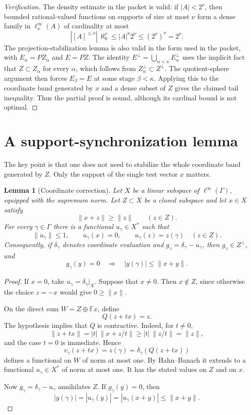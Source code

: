\documentclass[11pt]{article}
\newtheorem{lemma}[theorem]{Lemma}
\theoremstyle{remark}
\newcommand{\F}{\mathbb F}
\begin{document}
\begin{proof}[Verification]
The density estimate in the packet is valid: if \(|A|<2^\nu\), then
bounded rational-valued functions on supports of size at most \(\nu\)
form a dense family in \(\ell_\nu^\infty(A)\) of cardinality at most
\[
 |[A]^{\leq\nu}|\,\aleph_0^\nu
 \leq |A|^\nu 2^\nu
 \leq (2^\nu)^\nu=2^\nu.
\]
The projection-stabilization lemma is also valid in the form used in the
packet, with
\(E_\alpha=\overline{PZ_\alpha}\) and
\(E=\overline{PZ}\).  The identity
\(E^\perp=\bigcup_{\alpha<\kappa}E_\alpha^\perp\) uses the implicit fact
that \(Z\subset Z_\alpha\) for every \(\alpha\), which follows from
\(Z_\alpha^\perp\subset Z^\perp\).  The quotient-sphere argument then
forces \(E_\beta=E\) at some stage \(\beta<\kappa\).  Applying this to the
coordinate band generated by \(x\) and a dense subset of \(Z\) gives the
claimed tail inequality.  Thus the partial proof is sound, although its
cardinal bound is not optimal.
\end{proof}

\section{A support-synchronization lemma}

The key point is that one does not need to stabilize the whole coordinate
band generated by \(Z\).  Only the support of the single test vector
\(x\) matters.

\begin{lemma}[Coordinate correction]
\label{lem:correction}
Let \(X\) be a linear subspace of \(\ell^\infty(\Gamma)\), equipped with
the supremum norm.  Let \(Z\subset X\) be a closed subspace and let
\(x\in X\) satisfy
\[
  \|x+z\|\geq\|z\|\qquad(z\in Z).
\]
For every \(\gamma\in\Gamma\) there is a functional
\(u_\gamma\in X^*\) such that
\[
 \|u_\gamma\|\leq1,\qquad
 u_\gamma(x)=0,\qquad
 u_\gamma(z)=z(\gamma)\quad(z\in Z).
\]
Consequently, if \(\delta_\gamma\) denotes coordinate evaluation and
\(g_\gamma=\delta_\gamma-u_\gamma\), then
\(g_\gamma\in Z^\perp\), and
\[
 g_\gamma(y)=0
 \quad\Longrightarrow\quad
 |y(\gamma)|\leq\|x+y\|.
\]
\end{lemma}

\begin{proof}
If \(x=0\), take \(u_\gamma=\delta_\gamma|_X\).  Suppose that
\(x\neq0\).  Then \(x\notin Z\), since otherwise the choice \(z=-x\)
would give \(0\geq\|x\|\).

On the direct sum \(W=Z\oplus\F x\), define
\[
 Q(z+t x)=z.
\]
The hypothesis implies that \(Q\) is contractive.  Indeed, for
\(t\neq0\),
\[
 \|z+t x\|
 =|t|\,\|x+z/t\|
 \geq |t|\,\|z/t\|
 =\|z\|,
\]
and the case \(t=0\) is immediate.  Hence
\[
 v_\gamma(z+t x)=z(\gamma)
 =\delta_\gamma(Q(z+t x))
\]
defines a functional on \(W\) of norm at most one.  By Hahn--Banach it
extends to a functional \(u_\gamma\in X^*\) of norm at most one.  It has
the stated values on \(Z\) and on \(x\).

Now \(g_\gamma=\delta_\gamma-u_\gamma\) annihilates \(Z\).  If
\(g_\gamma(y)=0\), then
\[
 |y(\gamma)|=|u_\gamma(y)|
 =|u_\gamma(x+y)|
 \leq\|x+y\|.
\]
\end{proof}
\end{document}
